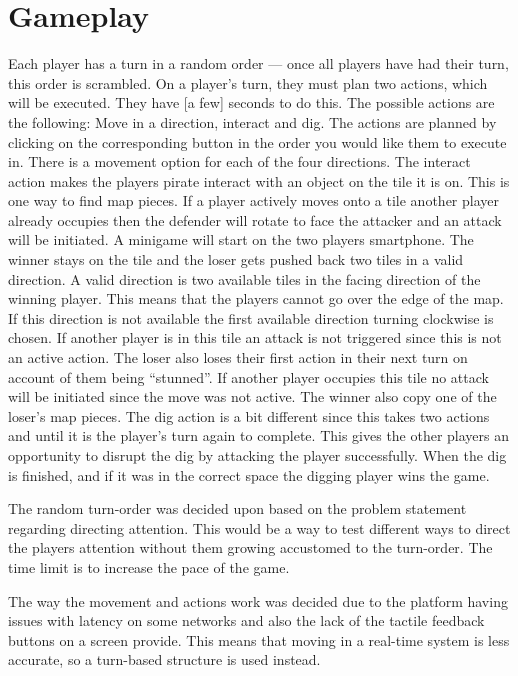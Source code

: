 \section{Gameplay}
Each player has a turn in a random order --- once all players have had their turn, this order is scrambled. On a player's turn, they must plan two actions, which will be executed. They have [a few] seconds to do this. The possible actions are the following: Move in a direction, interact and dig. The actions are planned by clicking on the corresponding button in the order you would like them to execute in. There is a movement option for each of the four directions. The interact action makes the players pirate interact with an object on the tile it is on. This is one way to find map pieces. If a player actively moves onto a tile another player already occupies then the defender will rotate to face the attacker and an attack will be initiated. A minigame will start on the two players smartphone. The winner stays on the tile and the loser gets pushed back two tiles in a valid direction. A valid direction is two available tiles in the facing direction of the winning player. This means that the players cannot go over the edge of the map. If this direction is not available the first available direction turning clockwise is chosen. If another player is in this tile an attack is not triggered since this is not an active action. The loser also loses their first action in their next turn on account of them being “stunned”. If another player occupies this tile no attack will be initiated since the move was not active. The winner also copy one of the loser’s map pieces. The dig action is a bit different since this takes two actions and until it is the player’s turn again to complete. This gives the other players an opportunity to disrupt the dig by attacking the player successfully. When the dig is finished, and if it was in the correct space the digging player wins the game. 

The random turn-order was decided upon based on the problem statement regarding directing attention. This would be a way to test different ways to direct the players attention without them growing accustomed to the turn-order. The time limit is to increase the pace of the game. 

The way the movement and actions work was decided due to the platform having issues with latency on some networks and also the lack of the tactile feedback buttons on a screen provide. This means that moving in a real-time system is less accurate, so a turn-based structure is used instead.

